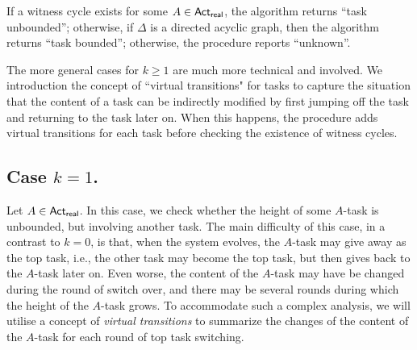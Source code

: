 
If a witness cycle exists for some $A  \in {\sf Act}_{\sf real}$, the algorithm returns ``task unbounded''; otherwise, if 
$\Delta$ is a directed acyclic graph, then the algorithm returns ``task bounded''; otherwise, the procedure reports ``unknown''.
 


The more general cases for $k\geq 1$ are much more technical and involved. We introduction the concept of ``virtual transitions" for tasks to capture the situation that the content of a task can be indirectly modified by first jumping off the task and returning to the task later on. When this happens, the 
procedure adds virtual transitions for each task before checking the existence of witness cycles.  

 
\subsection*{Case $k=1$.}
Let $A \in {\sf Act}_{\sf real}$. In this case, we check whether the height of some $A$-task is unbounded, but involving another task. %
The main difficulty of this case, in a contrast to $k=0$, is that, when the system evolves, %
the $A$-task may give away as the top task, i.e., the other task may become the top task, but then gives back to the $A$-task later on. Even worse, the content of the $A$-task may have be changed during the round of switch over, and there may be several rounds during which the height of the $A$-task grows.  %
To accommodate such a complex analysis, we will utilise a concept of \emph{virtual transitions} to summarize the changes of the content of the $A$-task for each round of top task switching. %


